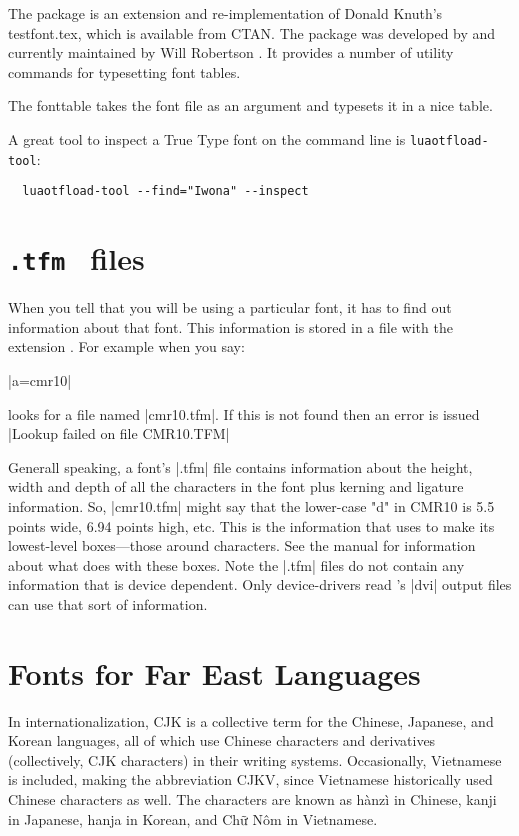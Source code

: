 The package  is an extension and re-implementation of Donald Knuth’s testfont.tex, which
is available from CTAN. The package was developed by  and currently maintained by Will Robertson \citep{fonttable}. It provides a number of utility commands for typesetting font tables.


The {fonttable} takes the font file as an  argument and typesets it in a nice table. 


A great tool to inspect a True Type font on the command line is \texttt{luaotfload-tool}:

\begin{verbatim}
  luaotfload-tool --find="Iwona" --inspect
\end{verbatim}

\section{ \texttt{.tfm } files}


When you tell \tex that you will be using a particular font, it has to find out information about that font. This information is stored in a file with the extension . For example when you say:

|\font a=cmr10|

\noindent \tex looks for  a file named |cmr10.tfm|. If this is not found then an error is issued |Lookup failed on file CMR10.TFM|

Generall speaking, a font's |.tfm| file contains information about the height, width and depth of all the characters in the font plus kerning and ligature information. So, |cmr10.tfm| might say that the lower-case "d" in CMR10 is 5.5 points wide, 6.94 points high, etc. This is the information that \tex uses to make its lowest-level boxes---those around characters. See the \tex manual for information about what \tex does with these boxes. Note the |.tfm| files do not contain any information that is device dependent. Only device-drivers read \tex's |dvi| output files can use that sort of information.


\section{Fonts for Far East Languages}

In internationalization, CJK is a collective term for the Chinese, Japanese, and Korean languages, all of which use Chinese characters and derivatives (collectively, CJK characters) in their writing systems. Occasionally, Vietnamese is included, making the abbreviation CJKV, since Vietnamese historically used Chinese characters as well.
The characters are known as hànzì in Chinese, kanji in Japanese, hanja in Korean, and Chữ Nôm in Vietnamese.


